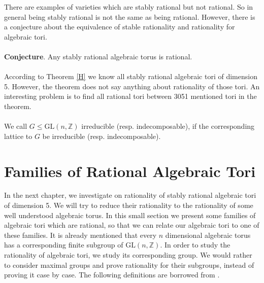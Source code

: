 \documentclass{article}
\theoremstyle{plain}
\theoremstyle{definition}
\newcommand{\Z}{\ensuremath{\mathbb{Z}}}
\newcommand{\G}{G}
\begin{document}
 \noindent
There are examples of varieties which are stably rational but not rational. So in general 
being stably rational is not the same as being rational. However, there is a conjecture 
about the equivalence of stable rationality and rationality for algebraic tori.\\ \\
 \textbf{Conjecture}. \cite[Section 2.6.1]{Voskresenskii} Any stably rational algebraic 
 torus is rational.\\
 \\
% 
According to Theorem \ref{H} we know all stably rational algebraic tori of dimension 5. 
However, the theorem does not say anything about rationality of those tori. An interesting 
problem is to find all rational tori between 3051 mentioned tori in the theorem.\\
\\

We call $\G \leq \mathrm{GL}(n,\Z)$ irreducible (resp. indecomposable), if the corresponding 
lattice to $G$ be irreducible (resp. indecomposable).
\\
 
\section{Families of Rational Algebraic Tori}
In the next chapter, we investigate on rationality of stably rational algebraic tori 
of dimension 5.  We will try to reduce their rationality to the rationality of some 
well understood algebraic torus. In this small section we present some families of 
algebraic tori which are rational, so that we can relate our algebraic tori to one 
of these families. It is already mentioned that every $n$ dimensional algebraic torus 
has a corresponding finite subgroup of $\mathrm{GL}(n,\Z)$. In order to study the 
rationality of algebraic tori, we study its corresponding group. We would rather to 
consider maximal groups and prove rationality for their subgroups, instead of proving 
it case by case. The following definitions are borrowed from \cite{Nicole1}.
\end{document}
